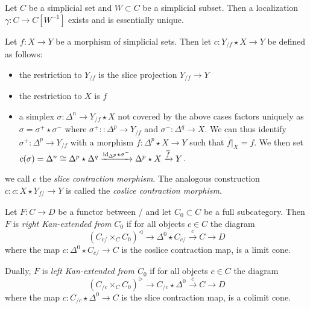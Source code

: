 \begin{prop} %
    Let $C$ be a simplicial set and $W\subset C$ be a simplicial subset.
    Then a localization $\gamma\colon C\to C[W^{-1}]$ exists and is essentially unique.
\end{prop}
\begin{construction}%
    Let $f\colon X\to Y$ be a morphism of simplicial sets.
    Then let $c\colon Y_{/f}\star X\to Y$ be defined as follows:
    \begin{itemize}
        \item the restriction to $Y_{/f}$ is the slice projection $Y_{/f}\to Y$
        \item the restriction to $X$ is $f$
        \item a simplex $\sigma\colon\Delta^n\to Y_{/f}\star X$ not covered by the above cases factors uniquely as $\sigma=\sigma^+\star\sigma^-$ where $\sigma^+\colon\colon\Delta^p\to Y_{/f}$ and $\sigma^-\colon\Delta^q\to X$.
              We can thus identify $\sigma^+\colon\Delta^p\to Y_{/f}$ with a morphism $\overline{f}\colon\Delta^p\star X\to Y$ such that $\overline{f}|_{X}=f$.
              We then set $c(\sigma)=\Delta^n\cong\Delta^p\star\Delta^q\xrightarrow{\text{id}_{\Delta^p}\star\sigma^-}\Delta^p\star X\xrightarrow{\overline{f}} Y$.
    \end{itemize}
    we call $c$ the \emph{slice contraction morphism}.
    The analogous construction $c\colon c\colon X\star Y_{f/}\to Y$ is called the \emph{coslice contraction morphism}.
\end{construction}
\begin{definition} %
    Let $F\colon C\to D$ be a functor between \inftycats/ and let $C_0\subset C$ be a full subcategory.
    Then $F$ is \emph{right Kan-extended from $C_0$} if for all objects $c\in C$ the diagram
    \begin{equation*}
        \left(C_{c/}\times_C C_0\right)^{\lhd}\to \Delta^0\star C_{c/}\xrightarrow{c} C\to D
    \end{equation*}
    where the map $c\colon\Delta^0\star C_{c/}\to C$ is the coslice contraction map, is a limit cone.

    Dually, $F$ is \emph{left Kan-extended from $C_0$} if for all objects $c\in C$ the diagram
    \begin{equation*}
        \left(C_{/c}\times_C C_0\right)^{\rhd}\to C_{/c}\star\Delta^0 \xrightarrow{c} C\to D
    \end{equation*}
    where the map $c\colon C_{/c}\star\Delta^0\to C$ is the slice contraction map, is a colimit cone.
\end{definition}
